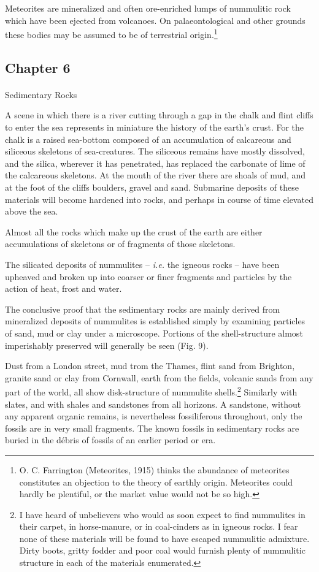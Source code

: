 \documentclass[a4paper, 12pt, oneside]{article}
\begin{document}
Meteorites are mineralized and often ore-enriched lumps of nummulitic rock which have been ejected from volcanoes. On palaeontological and other grounds these bodies may be assumed to be of terrestrial origin.\footnote{O. C. Farrington (Meteorites, 1915) thinks the abundance of meteorites constitutes an objection to the theory of earthly origin. Meteorites could hardly be plentiful, or the market value would not be so high.}
\clearpage
\subsection{Chapter 6}
\paragraph{}
Sedimentary Rocks

A scene in which there is a river cutting through a gap in the chalk and flint cliffs to enter the sea represents in miniature the history of the earth's crust. For the chalk is a raised sea-bottom composed of an accumulation of calcareous and siliceous skeletons of sea-creatures. The siliceous remains have mostly dissolved, and the silica, wherever it has penetrated, has replaced the carbonate of lime of the calcareous skeletons. At the mouth of the river there are shoals of mud, and at the foot of the cliffs boulders, gravel and sand. Submarine deposits of these materials will become hardened into rocks, and perhaps in course of time elevated above the sea.

Almost all the rocks which make up the crust of the earth are either accumulations of skeletons or of fragments of those skeletons.

The silicated deposits of nummulites -- \emph{i.e.} the igneous rocks -- have been upheaved and broken up into coarser or finer fragments and particles by the action of heat, frost and water.

The conclusive proof that the sedimentary rocks are mainly derived from mineralized deposits of nummulites is established simply by examining particles of sand, mud or clay under a microscope. Portions of the shell-structure almost imperishably preserved will generally be seen (Fig. 9).

Dust from a London street, mud trom the Thames, flint sand from Brighton, granite sand or clay from Cornwall, earth from the fields, volcanic sands from any part of the world, all show disk-structure of nummulite shells.\footnote{I have heard of unbelievers who would as soon expect to find nummulites in their carpet, in horse-manure, or in coal-cinders as in igneous rocks. I fear none of these materials will be found to have escaped nummulitic admixture. Dirty boots, gritty fodder and poor coal would furnish plenty of nummulitic structure in each of the materials enumerated.} Similarly with slates, and with shales and sandstones from all horizons. A sandstone, without any apparent organic remains, is nevertheless fossiliferous throughout, only the fossils are in very small fragments. The known fossils in sedimentary rocks are buried in the débris of fossils of an earlier period or era.
\end{document}
